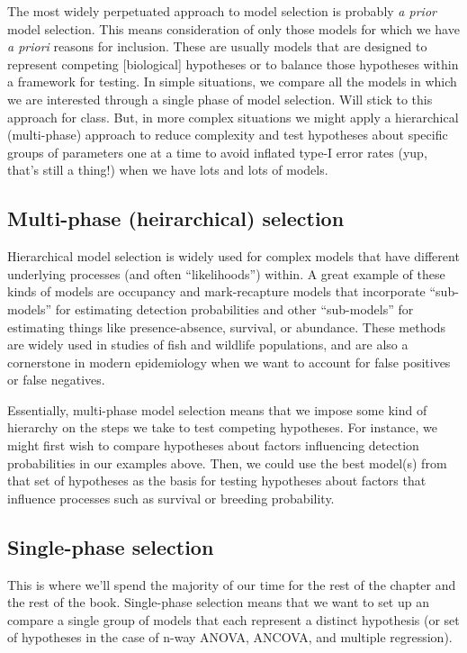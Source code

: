 \documentclass[
]{book}
\begin{document}
The most widely perpetuated approach to model selection is probably \emph{a prior} model selection. This means consideration of only those models for which we have \emph{a priori} reasons for inclusion. These are usually models that are designed to represent competing {[}biological{]} hypotheses or to balance those hypotheses within a framework for testing. In simple situations, we compare all the models in which we are interested through a single phase of model selection. Will stick to this approach for class. But, in more complex situations we might apply a hierarchical (multi-phase) approach to reduce complexity and test hypotheses about specific groups of parameters one at a time to avoid inflated type-I error rates (yup, that's still a thing!) when we have lots and lots of models.

\hypertarget{multi-phase-heirarchical-selection}{%
\subsection{Multi-phase (heirarchical) selection}\label{multi-phase-heirarchical-selection}}

Hierarchical model selection is widely used for complex models that have different underlying processes (and often ``likelihoods'') within. A great example of these kinds of models are occupancy and mark-recapture models that incorporate ``sub-models'' for estimating detection probabilities and other ``sub-models'' for estimating things like presence-absence, survival, or abundance. These methods are widely used in studies of fish and wildlife populations, and are also a cornerstone in modern epidemiology when we want to account for false positives or false negatives.

Essentially, multi-phase model selection means that we impose some kind of hierarchy on the steps we take to test competing hypotheses. For instance, we might first wish to compare hypotheses about factors influencing detection probabilities in our examples above. Then, we could use the best model(s) from that set of hypotheses as the basis for testing hypotheses about factors that influence processes such as survival or breeding probability.

\hypertarget{single-phase-selection}{%
\subsection{Single-phase selection}\label{single-phase-selection}}

This is where we'll spend the majority of our time for the rest of the chapter and the rest of the book. Single-phase selection means that we want to set up an compare a single group of models that each represent a distinct hypothesis (or set of hypotheses in the case of n-way ANOVA, ANCOVA, and multiple regression).
\end{document}

